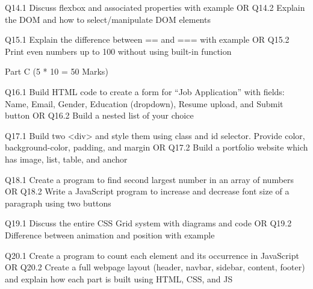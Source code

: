 Q14.1 Discuss flexbox and associated properties with example
OR
Q14.2 Explain the DOM and how to select/manipulate DOM elements

Q15.1 Explain the difference between == and === with example
OR
Q15.2 Print even numbers up to 100 without using built-in function

Part C (5 * 10 = 50 Marks)

Q16.1 Build HTML code to create a form for “Job Application” with fields:
Name, Email, Gender, Education (dropdown), Resume upload, and Submit button
OR
Q16.2 Build a nested list of your choice

Q17.1 Build two <div> and style them using class and id selector.
Provide color, background-color, padding, and margin
OR
Q17.2 Build a portfolio website which has image, list, table, and anchor

Q18.1 Create a program to find second largest number in an array of numbers
OR
Q18.2 Write a JavaScript program to increase and decrease font size of a paragraph using two buttons

Q19.1 Discuss the entire CSS Grid system with diagrams and code
OR
Q19.2 Difference between animation and position with example

Q20.1 Create a program to count each element and its occurrence in JavaScript
OR
Q20.2 Create a full webpage layout (header, navbar, sidebar, content, footer) and explain how each part is built using HTML, CSS, and JS
